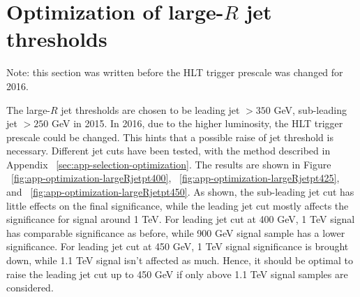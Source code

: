 \section{Optimization of large-$R$ jet \pt thresholds}
\label{sec:app-optimization-largeRjetpt}

Note: this section was written before the HLT trigger prescale was changed for 2016.

The large-$R$ jet \pt thresholds are chosen to be leading jet \pt$ >  350 $ GeV, sub-leading jet \pt$ >  250 $ GeV in 2015. In 2016, due to the higher luminosity, the HLT trigger prescale could be changed. This hints that a possible raise of jet \pt threshold is necessary. Different jet \pt cuts have been tested, with the method described in Appendix ~\ref{sec:app-selection-optimization}. The results are shown in Figure ~\ref{fig:app-optimization-largeRjetpt400}, ~\ref{fig:app-optimization-largeRjetpt425}, and ~\ref{fig:app-optimization-largeRjetpt450}. As shown, the sub-leading jet \pt cut has little effects on the final significance, while the leading jet \pt cut mostly affects the significance for signal around 1 TeV. For leading jet  \pt cut at 400 GeV, 1 TeV signal has comparable significance as before, while 900 GeV signal sample has a lower significance. For leading jet \pt cut at 450 GeV, 1 TeV signal significance is brought down, while 1.1 TeV signal isn't affected as much. Hence, it should be optimal to raise the leading jet \pt cut up to 450 GeV if only above 1.1 TeV signal samples are considered.

\begin{figure*}[htbp!]
\begin{center}
  \caption{Estimated significance and comparison to leading jet \pt$ >  350 $ GeV, sub-leading jet \pt$ >  250 $ GeV. Top: leading jet \pt$ >  400 $ GeV, sub-leading jet \pt$ >  250 $ GeV; middle: leading jet \pt$ >  400 $ GeV, sub-leading jet \pt$ >  275 $ GeV; bottom: leading jet \pt$ >  400 $ GeV, sub-leading jet \pt$ > 300 $ GeV. }
  \label{fig:app-optimization-largeRjetpt400}
\end{center}
\end{figure*}


